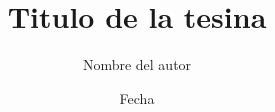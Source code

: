 \documentclass[a4paper,oneside]{book}
\begin{document}
\renewcommand{\tablename}{Tabla}
\renewcommand{\figurename}{Figura}



\title{Titulo de la tesina}

\author{Nombre del autor}

\date{Fecha}


\maketitle



















\end{document}
